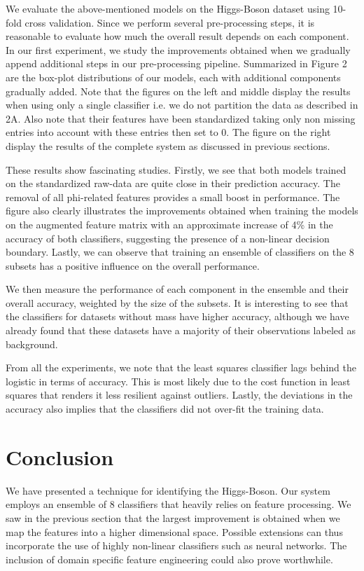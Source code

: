 \documentclass[10pt,conference,compsocconf]{IEEEtran}
\begin{document}
We evaluate the above-mentioned models on the Higgs-Boson dataset using 10-fold cross validation. Since we perform several pre-processing steps, it is reasonable to evaluate how much the overall result depends on each component. In our first experiment, we study the improvements obtained when we gradually append additional steps in our pre-processing pipeline. Summarized in Figure 2 are the box-plot distributions of our models, each with additional components gradually added. Note that the figures on the left and middle display the results when using only a single classifier i.e. we do not partition the data as described in 2A. Also note that their features have been standardized taking only non missing entries into account with these entries then set to 0. The figure on the right display the results of the complete system as discussed in previous sections.

These results show fascinating studies. Firstly, we see that both models trained on the standardized raw-data are quite close in their prediction accuracy. The removal of all phi-related features provides a small boost in performance. The figure also clearly illustrates the improvements obtained when training the models on the augmented feature matrix with an approximate increase of 4\% in the accuracy of both classifiers, suggesting the presence of a non-linear decision boundary. Lastly, we can observe that training an ensemble of classifiers on the 8 subsets has a positive influence on the overall performance. 

We then measure the performance of each component in the ensemble and their overall accuracy, weighted by the size of the subsets. It is interesting to see that the classifiers for datasets without mass have higher accuracy, although we have already found that these datasets have a majority of their observations labeled as background. 

From all the experiments, we note that the least squares classifier lags behind the logistic in terms of accuracy. This is most likely due to the cost function in least squares that renders it less resilient against outliers. Lastly, the deviations in the accuracy also implies that the classifiers did not over-fit the training data.

\section{Conclusion}

We have presented a technique for identifying the Higgs-Boson. Our system employs an ensemble of 8 classifiers that heavily relies on feature processing. We saw in the previous section that the largest improvement is obtained when we map the features into a higher dimensional space. Possible extensions can thus incorporate the use of highly non-linear classifiers such as neural networks. The inclusion of domain specific feature engineering could also prove worthwhile.



\end{document}
